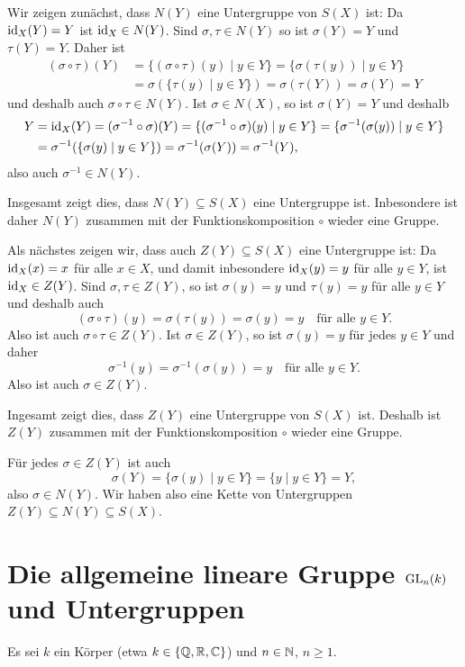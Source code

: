 Wir zeigen zunächst, dass $N(Y)$ eine Untergruppe von $S(X)$ ist: Da $\mathrm{id}_X(Y) = Y$ ist $\mathrm{id}_X \in N(Y)$. Sind $\sigma, \tau \in N(Y)$ so ist $\sigma(Y) = Y$ und $\tau(Y) = Y$. Daher ist
\begin{align*}
 (\sigma \circ \tau)(Y)
 &= \{(\sigma \circ \tau)(y) \mid y \in Y\}
 = \{\sigma(\tau(y)) \mid y \in Y\} \\
 &= \sigma(\{\tau(y) \mid y \in Y\})
 = \sigma(\tau(Y))
 = \sigma(Y)
 = Y
\end{align*}
und deshalb auch $\sigma \circ \tau \in N(Y)$. Ist $\sigma \in N(X)$, so ist $\sigma(Y) = Y$ und deshalb
\begin{align*}
 Y
 &= \mathrm{id}_X(Y)
 = (\sigma^{-1} \circ \sigma)(Y)
 = \{(\sigma^{-1} \circ \sigma)(y) \mid y \in Y\}
 = \{\sigma^{-1}(\sigma(y)) \mid y \in Y\} \\
 &= \sigma^{-1}(\{\sigma(y) \mid y \in Y\})
 = \sigma^{-1}(\sigma(Y))
 = \sigma^{-1}(Y),
\end{align*}
also auch $\sigma^{-1} \in N(Y)$.

Insgesamt zeigt dies, dass $N(Y) \subseteq S(X)$ eine Untergruppe ist. Inbesondere ist daher $N(Y)$ zusammen mit der Funktionskomposition $\circ$ wieder eine Gruppe.

Als nächstes zeigen wir, dass auch $Z(Y) \subseteq S(X)$ eine Untergruppe ist: Da $\mathrm{id}_X(x) = x$ für alle $x \in X$, und damit inbesondere $\mathrm{id}_X(y) = y$ für alle $y \in Y$, ist $\mathrm{id}_X \in Z(Y)$. Sind $\sigma, \tau \in Z(Y)$, so ist $\sigma(y) = y$ und $\tau(y) = y$ für alle $y \in Y$ und deshalb auch
\[
 (\sigma \circ \tau)(y)
 = \sigma(\tau(y))
 = \sigma(y)
 = y
 \quad
 \text{für alle $y \in Y$}.
\]
Also ist auch $\sigma \circ \tau \in Z(Y)$. Ist $\sigma \in Z(Y)$, so ist $\sigma(y) = y$ für jedes $y \in Y$ und daher
\[
 \sigma^{-1}(y) = \sigma^{-1}(\sigma(y)) = y
 \quad
 \text{für alle $y \in Y$}.
\]
Also ist auch $\sigma \in Z(Y)$.

Ingesamt zeigt dies, dass $Z(Y)$ eine Untergruppe von $S(X)$ ist. Deshalb ist $Z(Y)$ zusammen mit der Funktionskomposition $\circ$ wieder eine Gruppe.

Für jedes $\sigma \in Z(Y)$ ist auch
\[
 \sigma(Y)
 = \{\sigma(y) \mid y \in Y\}
 = \{y \mid y \in Y\}
 = Y,
\]
also $\sigma \in N(Y)$. Wir haben also eine Kette von Untergruppen $Z(Y) \subseteq N(Y) \subseteq S(X)$.






\section{Die allgemeine lineare Gruppe \texorpdfstring{$\mathrm{GL}_n(k)$}{GLnk} und Untergruppen}
Es sei $k$ ein Körper (etwa $k \in \{\mathbb{Q}, \mathbb{R}, \mathbb{C}\}$) und $n \in \mathbb{N}$, $n \geq 1$.



